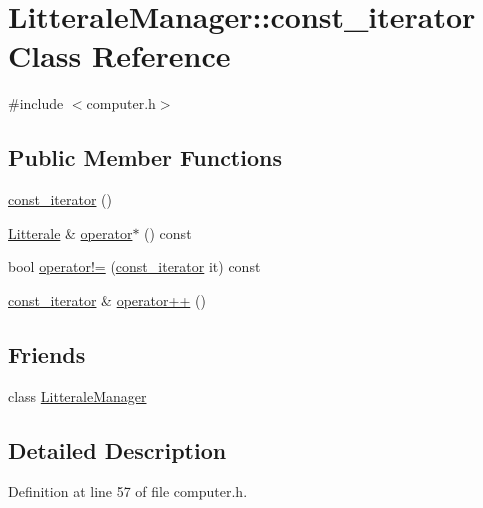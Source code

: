 \hypertarget{class_litterale_manager_1_1const__iterator}{}\section{Litterale\+Manager\+:\+:const\+\_\+iterator Class Reference}
\label{class_litterale_manager_1_1const__iterator}


{\ttfamily \#include $<$computer.\+h$>$}

\subsection*{Public Member Functions}
\begin{DoxyCompactItemize}
\item 
\hyperlink{class_litterale_manager_1_1const__iterator_a297f7ff2a4c44f214f24ddfe0746d474}{const\+\_\+iterator} ()
\item 
\hyperlink{class_litterale}{Litterale} \& \hyperlink{class_litterale_manager_1_1const__iterator_a94ae2a366cb4df6f156c583127a51949}{operator$\ast$} () const 
\item 
bool \hyperlink{class_litterale_manager_1_1const__iterator_aece1060c527579ba12bcfc6695b72c61}{operator!=} (\hyperlink{class_litterale_manager_1_1const__iterator}{const\+\_\+iterator} it) const 
\item 
\hyperlink{class_litterale_manager_1_1const__iterator}{const\+\_\+iterator} \& \hyperlink{class_litterale_manager_1_1const__iterator_a79cc39e96a28dffb40c4849a600043fd}{operator++} ()
\end{DoxyCompactItemize}
\subsection*{Friends}
\begin{DoxyCompactItemize}
\item 
class \hyperlink{class_litterale_manager_1_1const__iterator_a0aab3199db1ebeb99e33e66b9cf8e975}{Litterale\+Manager}
\end{DoxyCompactItemize}


\subsection{Detailed Description}


Definition at line 57 of file computer.\+h.



